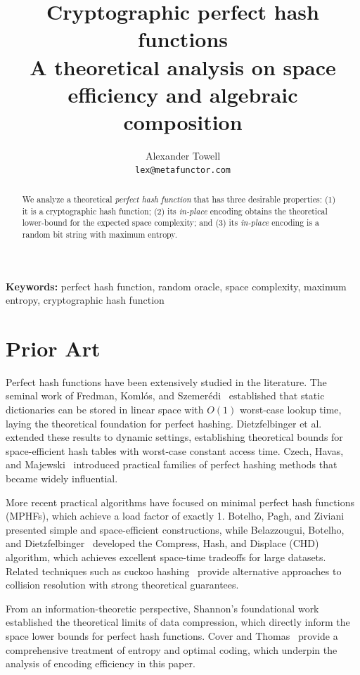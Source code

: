 \documentclass[hidelinks,11pt,final]{article}
\title
{
    Cryptographic perfect hash functions\\
    \large A theoretical analysis on space efficiency and algebraic composition
}
\author
{
    Alexander Towell\\
    \texttt{lex@metafunctor.com}
}
\date{}
\theoremstyle{plain}
\begin{document}
\maketitle
\begin{abstract}
We analyze a theoretical \emph{perfect hash function} that has three desirable properties: (1) it is a cryptographic hash function; (2) its \emph{in-place} encoding obtains the theoretical lower-bound for the expected space complexity; and (3) its \emph{in-place} encoding is a random bit string with maximum entropy.
\end{abstract}

\textbf{Keywords:} perfect hash function,
        random oracle, space complexity,
        maximum entropy, cryptographic hash function

\tableofcontents


\section{Prior Art}
Perfect hash functions have been extensively studied in the literature. The seminal work of Fredman, Koml\'{o}s, and Szemer\'{e}di~\cite{fks} established that static dictionaries can be stored in linear space with $O(1)$ worst-case lookup time, laying the theoretical foundation for perfect hashing. Dietzfelbinger et al.~\cite{phf} extended these results to dynamic settings, establishing theoretical bounds for space-efficient hash tables with worst-case constant access time. Czech, Havas, and Majewski~\cite{pmf} introduced practical families of perfect hashing methods that became widely influential.

More recent practical algorithms have focused on minimal perfect hash functions (MPHFs), which achieve a load factor of exactly 1. Botelho, Pagh, and Ziviani~\cite{simple} presented simple and space-efficient constructions, while Belazzougui, Botelho, and Dietzfelbinger~\cite{chd,mphfsurvey} developed the Compress, Hash, and Displace (CHD) algorithm, which achieves excellent space-time tradeoffs for large datasets. Related techniques such as cuckoo hashing~\cite{cuckoo} provide alternative approaches to collision resolution with strong theoretical guarantees.

From an information-theoretic perspective, Shannon's foundational work~\cite{shannon} established the theoretical limits of data compression, which directly inform the space lower bounds for perfect hash functions. Cover and Thomas~\cite{coverandthomas} provide a comprehensive treatment of entropy and optimal coding, which underpin the analysis of encoding efficiency in this paper.
\end{document}
